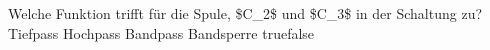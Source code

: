     {Welche Funktion trifft für die Spule, \$C\_2\$ und \$C\_3\$ in der Schaltung zu?}
    {Tiefpass}
    {Hochpass}
    {Bandpass}
    {Bandsperre}
    {true}{false}